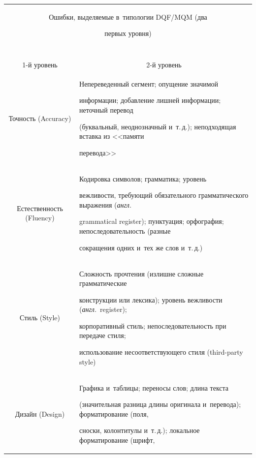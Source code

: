   \begin{table}\small

  \begin{center}

  \begin{tabular}{|c|p{79mm}|}

  \multicolumn{2}{c}{Ошибки, выделяемые в~типологии DQF\!/\!MQM (два 

первых уровня)}\\

   \multicolumn{2}{c}{\ }\\[-6pt]

   \hline

1-й уровень&\multicolumn{1}{c|}{2-й уровень }\\

\hline

  Точность (Accuracy)&Непереведенный сегмент; опущение значимой 

информации; добавление лишней информации; неточный перевод 

(буквальный, неоднозначный и~т.\,д.); неподходящая вставка из <<памяти 

перевода>>\\

  \hline

  Естественность (Fluency)&Кодировка символов; грамматика; уровень 

веж\-ли\-вости, требующий обязательного грамматического выражения (\textit{англ.}\ 

grammatical register); пунктуация; орфография; непоследовательность (разные 

сокращения одних и~тех же слов и~т.\,д.)\\

  \hline

  Стиль (Style)&Сложность прочтения (излишне сложные грамматические 

конструкции или лексика); уровень вежливости (\textit{англ.}\ register); 

корпоративный стиль; непоследовательность при передаче стиля; 

использование несоответствующего стиля (third-party style)\\

  \hline

  Дизайн (Design)&Графика и~таблицы; переносы слов; длина текста 

(значительная разница длины оригинала и~перевода); форматирование (поля, 

сноски, колонтитулы и~т.\,д.); локальное форматирование (шрифт, 


\end{tabular}
\end{center}
\end{table}
